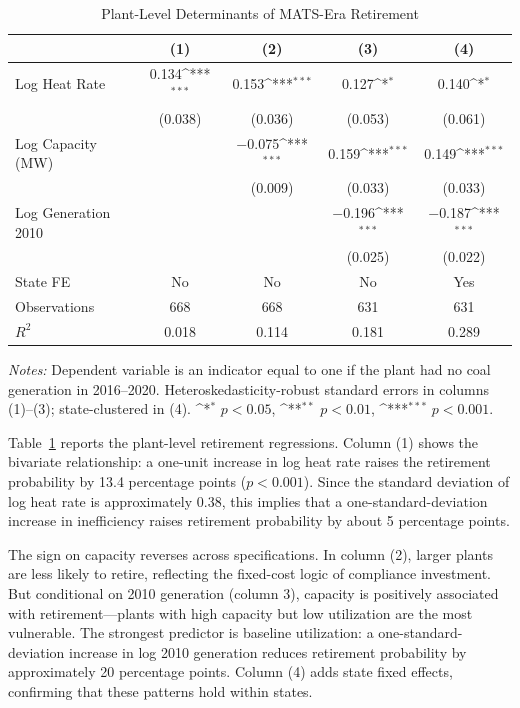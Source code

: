 \documentclass[12pt]{article}
\newcommand{\sym}[1]{\ifmmode^{#1}\else\(^{#1}\)\fi}
\begin{document}
\begin{table}[H]
\centering
\caption{Plant-Level Determinants of MATS-Era Retirement}
\begin{threeparttable}
\begin{tabular}{lcccc}
\toprule
& (1) & (2) & (3) & (4) \\
\midrule
Log Heat Rate & 0.134\sym{***} & 0.153\sym{***} & 0.127\sym{*} & 0.140\sym{*} \\
& (0.038) & (0.036) & (0.053) & (0.061) \\
Log Capacity (MW) & & $-$0.075\sym{***} & 0.159\sym{***} & 0.149\sym{***} \\
& & (0.009) & (0.033) & (0.033) \\
Log Generation 2010 & & & $-$0.196\sym{***} & $-$0.187\sym{***} \\
& & & (0.025) & (0.022) \\
\addlinespace
State FE & No & No & No & Yes \\
Observations & 668 & 668 & 631 & 631 \\
$R^2$ & 0.018 & 0.114 & 0.181 & 0.289 \\
\bottomrule
\end{tabular}
\begin{tablenotes}[flushleft]
\small
\item \textit{Notes:} Dependent variable is an indicator equal to one if the plant had no coal generation in 2016--2020. Heteroskedasticity-robust standard errors in columns (1)--(3); state-clustered in (4). \sym{*} $p<0.05$, \sym{**} $p<0.01$, \sym{***} $p<0.001$.
\end{tablenotes}
\end{threeparttable}
\label{tab:first_stage}
\end{table}

Table~\ref{tab:first_stage} reports the plant-level retirement regressions. Column (1) shows the bivariate relationship: a one-unit increase in log heat rate raises the retirement probability by 13.4 percentage points ($p < 0.001$). Since the standard deviation of log heat rate is approximately 0.38, this implies that a one-standard-deviation increase in inefficiency raises retirement probability by about 5 percentage points.

The sign on capacity reverses across specifications. In column (2), larger plants are less likely to retire, reflecting the fixed-cost logic of compliance investment. But conditional on 2010 generation (column 3), capacity is positively associated with retirement---plants with high capacity but low utilization are the most vulnerable. The strongest predictor is baseline utilization: a one-standard-deviation increase in log 2010 generation reduces retirement probability by approximately 20 percentage points. Column (4) adds state fixed effects, confirming that these patterns hold within states.
\end{document}
